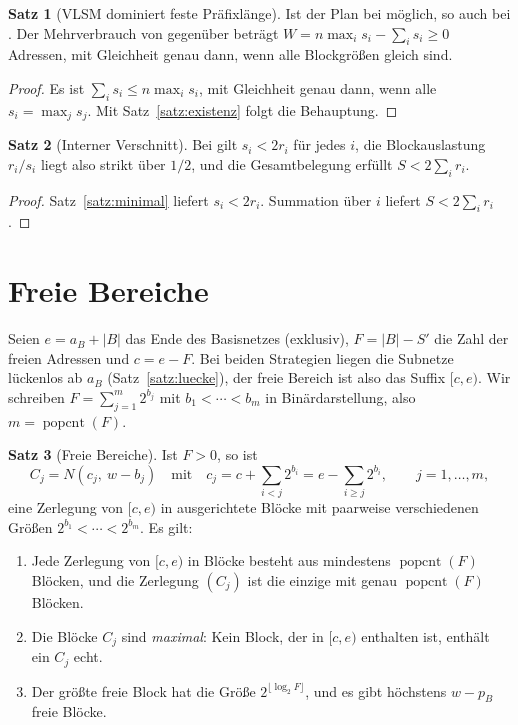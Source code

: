 \documentclass[a4paper,12pt, twoside]{report}
\theoremstyle{definition}
\newtheorem{satz}{Satz}
\DeclareMathOperator{\popcnt}{popcnt}
\newcommand{\code}[1]{\texttt{\detokenize{#1}}}
\begin{document}
\begin{satz}[VLSM dominiert feste Präfixlänge]
\label{satz:fixed}
	Ist der Plan bei \code{fixed} möglich, so auch bei \code{vlsm}. Der Mehrverbrauch von \code{fixed} gegenüber \code{vlsm} beträgt $W = n\max_i s_i - \sum_i s_i \ge 0$ Adressen, mit Gleichheit genau dann, wenn alle Blockgrößen gleich sind.
\end{satz}

\begin{proof}
	Es ist $\sum_i s_i \le n\max_i s_i$, mit Gleichheit genau dann, wenn alle $s_i = \max_j s_j$. Mit Satz~\ref{satz:existenz} folgt die Behauptung.
\end{proof}

\begin{satz}[Interner Verschnitt]
\label{satz:verschnitt}
	Bei \code{vlsm} gilt $s_i < 2r_i$ für jedes $i$, die Blockauslastung $r_i/s_i$ liegt also strikt über $1/2$, und die Gesamtbelegung erfüllt $S < 2\sum_i r_i$.
\end{satz}

\begin{proof}
	Satz~\ref{satz:minimal} liefert $s_i < 2r_i$. Summation über $i$ liefert $S < 2\sum_i r_i$.
\end{proof}

\section{Freie Bereiche}
\label{sec:frei}

Seien $e = a_B + |B|$ das Ende des Basisnetzes (exklusiv), $F = |B| - S'$ die Zahl der freien Adressen und $c = e - F$. Bei beiden Strategien liegen die Subnetze lückenlos ab $a_B$ (Satz~\ref{satz:luecke}), der freie Bereich ist also das Suffix $[c, e)$. Wir schreiben $F = \sum_{j=1}^{m} 2^{b_j}$ mit $b_1 < \cdots < b_m$ in Binärdarstellung, also $m = \popcnt(F)$.

\begin{satz}[Freie Bereiche]
\label{satz:frei}
	Ist $F > 0$, so ist
	\[
	C_j = N(c_j,\ w - b_j) \quad\text{mit}\quad c_j = c + \sum_{i<j} 2^{b_i} = e - \sum_{i \ge j} 2^{b_i}, \qquad j = 1,\ldots,m,
	\]
	eine Zerlegung von $[c,e)$ in ausgerichtete Blöcke mit paarweise verschiedenen Größen $2^{b_1} < \cdots < 2^{b_m}$. Es gilt:
	\begin{enumerate}[label=(F\arabic*)]
		\item Jede Zerlegung von $[c,e)$ in Blöcke besteht aus mindestens $\popcnt(F)$ Blöcken, und die Zerlegung $(C_j)$ ist die einzige mit genau $\popcnt(F)$ Blöcken.
		\item Die Blöcke $C_j$ sind \emph{maximal}: Kein Block, der in $[c,e)$ enthalten ist, enthält ein $C_j$ echt.
		\item Der größte freie Block hat die Größe $2^{\lfloor \log_2 F\rfloor}$, und es gibt höchstens $w - p_B$ freie Blöcke.
	\end{enumerate}
\end{satz}
\end{document}
